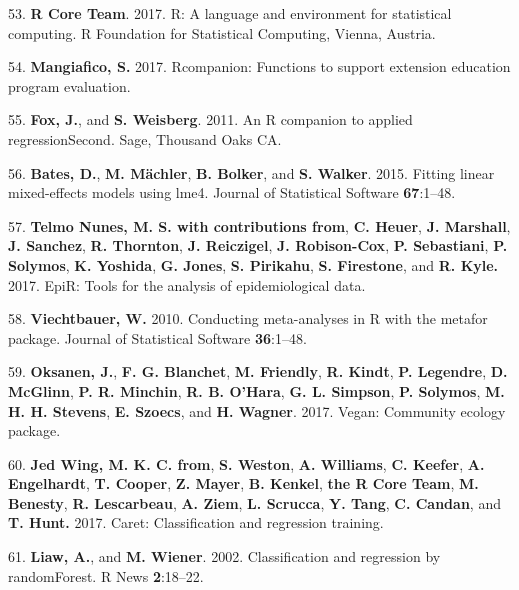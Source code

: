 \documentclass[12pt,]{article}
\begin{document}
\hypertarget{ref-r_citation_2017}{}
53. \textbf{R Core Team}. 2017. R: A language and environment for
statistical computing. R Foundation for Statistical Computing, Vienna,
Austria.

\hypertarget{ref-rcompanion_citation_2017}{}
54. \textbf{Mangiafico, S.} 2017. Rcompanion: Functions to support
extension education program evaluation.

\hypertarget{ref-car_citation_2011}{}
55. \textbf{Fox, J.}, and \textbf{S. Weisberg}. 2011. An R companion to
applied regressionSecond. Sage, Thousand Oaks CA.

\hypertarget{ref-lme4_citation_2015}{}
56. \textbf{Bates, D.}, \textbf{M. Mächler}, \textbf{B. Bolker}, and
\textbf{S. Walker}. 2015. Fitting linear mixed-effects models using
lme4. Journal of Statistical Software \textbf{67}:1--48.

\hypertarget{ref-epir_citation_2017}{}
57. \textbf{Telmo Nunes, M. S. with contributions from}, \textbf{C.
Heuer}, \textbf{J. Marshall}, \textbf{J. Sanchez}, \textbf{R. Thornton},
\textbf{J. Reiczigel}, \textbf{J. Robison-Cox}, \textbf{P. Sebastiani},
\textbf{P. Solymos}, \textbf{K. Yoshida}, \textbf{G. Jones}, \textbf{S.
Pirikahu}, \textbf{S. Firestone}, and \textbf{R. Kyle.} 2017. EpiR:
Tools for the analysis of epidemiological data.

\hypertarget{ref-metafor_citation_2010}{}
58. \textbf{Viechtbauer, W.} 2010. Conducting meta-analyses in R with
the metafor package. Journal of Statistical Software \textbf{36}:1--48.

\hypertarget{ref-vegan_citation_2017}{}
59. \textbf{Oksanen, J.}, \textbf{F. G. Blanchet}, \textbf{M. Friendly},
\textbf{R. Kindt}, \textbf{P. Legendre}, \textbf{D. McGlinn}, \textbf{P.
R. Minchin}, \textbf{R. B. O'Hara}, \textbf{G. L. Simpson}, \textbf{P.
Solymos}, \textbf{M. H. H. Stevens}, \textbf{E. Szoecs}, and \textbf{H.
Wagner}. 2017. Vegan: Community ecology package.

\hypertarget{ref-caret_citation_2017}{}
60. \textbf{Jed Wing, M. K. C. from}, \textbf{S. Weston}, \textbf{A.
Williams}, \textbf{C. Keefer}, \textbf{A. Engelhardt}, \textbf{T.
Cooper}, \textbf{Z. Mayer}, \textbf{B. Kenkel}, \textbf{the R Core
Team}, \textbf{M. Benesty}, \textbf{R. Lescarbeau}, \textbf{A. Ziem},
\textbf{L. Scrucca}, \textbf{Y. Tang}, \textbf{C. Candan}, and
\textbf{T. Hunt.} 2017. Caret: Classification and regression training.

\hypertarget{ref-randomforest_citation_2002}{}
61. \textbf{Liaw, A.}, and \textbf{M. Wiener}. 2002. Classification and
regression by randomForest. R News \textbf{2}:18--22.
\end{document}
